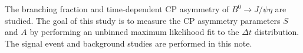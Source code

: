 \documentclass{article}
\begin{document}
The branching fraction and time-dependent CP asymmetry of $B^0 \rightarrow J/\psi \eta$ are studied. The goal of this study is to measure the CP asymmetry parameters $S$ and $A$ by performing an unbinned maximum likelihood fit to the $\Delta t$ distribution. The signal event and background studies are performed in this note.
\end{document}
